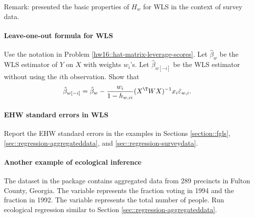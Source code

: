  



 
 Remark: 
\citet{li2009survey} presented the basic properties of $H_w$ for WLS in the context of survey data. 




\paragraph{Leave-one-out formula for WLS}
\label{hw16::loo-for-wls}


Use the notation in Problem \ref{hw16::hat-matrix-leverage-scores}. 
Let $\hat\beta_w$ be the WLS estimator of $Y$ on $X$ with weights $w_i$'s. Let $\hat{\beta}_{w[-i]}$ be the WLS estimator without using the $i$th observation. Show that 
$$
\hat{\beta}_{w[-i]} = \hat\beta_w - \frac{ w_i }{ 1-h_{w,ii} }  (X^{\T} W X)^{-1} x_i \hat{\varepsilon}_{w,i} .
$$







\paragraph{EHW standard errors in WLS}

Report the EHW standard errors in the examples in Sections \ref{section::fgls}, \ref{sec::regression-aggregateddata}, and \ref{sec::regression-surveydata}. 


 
 
 
\paragraph{Another example of ecological inference}\label{hw16::ecological-regression2}

The  dataset in the  package contains aggregated data from 289 precincts in Fulton County, Georgia. The variable  represents the fraction voting in 1994 and  the fraction in 1992. The variable  represents the total number of people. Run ecological regression similar to   Section \ref{sec::regression-aggregateddata}. 



